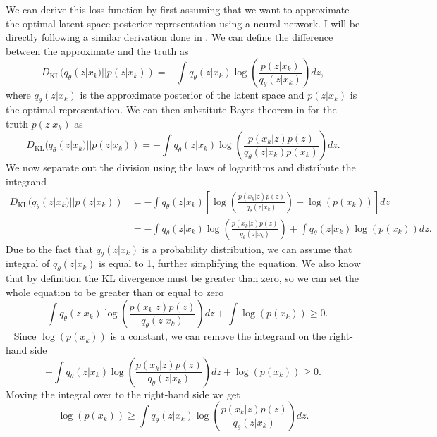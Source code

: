 We can derive this loss function by first assuming that we 
want to approximate the optimal latent space posterior 
representation using a neural network. I will be directly following a 
similar derivation done in \cite{1907.08956}. We can define the 
difference between the approximate and the truth as 
%
\begin{equation}
    D_{\textrm{KL}}(q_{\theta}(z|x_k) || p(z|x_k)) = -\int q_{\theta}(z|x_k) \log\left(\frac{p(z|x_k)}{q_{\theta}(z|x_k)}\right) dz,
\end{equation}
%
where $q_{\theta}(z|x_k)$ is the approximate posterior of the 
latent space and $p(z|x_k)$ is the optimal representation. 
We can then substitute Bayes theorem in for the truth 
$p(z|x_k)$ as 
%
\begin{equation}
    D_{\textrm{KL}}(q_{\theta}(z|x_k) || p(z|x_k)) = -\int q_{\theta}(z|x_k) 
    \log\left(\frac{p(x_k|z) p(z)}{q_{\theta}(z|x_k) p(x_k)}\right) dz. 
\end{equation}
%
We now separate out the division using the laws of logarithms and 
distribute the integrand
%
\begin{align}
    D_{\textrm{KL}}(q_{\theta}(z|x_k) || p(z|x_k)) &= -\int q_{\theta}(z|x_k) 
    \left[\log\left(\frac{p(x_k|z) p(z)}{q_{\theta}(z|x_k)}\right) - \log(p(x_k))\right] dz \nonumber \\
    &= -\int q_{\theta}(z|x_k) 
    \log\left(\frac{p(x_k|z) p(z)}{q_{\theta}(z|x_k)}\right) +
    \int q_{\theta}(z|x_k) \log(p(x_k)) dz. 
\end{align}
%
Due to the fact that $q_{\theta}(z|x_k)$ is a probability distribution, 
we can assume that integral of $q_{\theta}(z|x_k)$ is equal to 1, 
further simplifying the equation. We also know that by definition the KL 
divergence must be greater than zero, so we can set the whole 
equation to be greater than or equal to zero
%
\begin{equation}
    -\int q_{\theta}(z|x_k)
    \log\left(\frac{p(x_k|z) p(z)}{q_{\theta}(z|x_k)}\right)dz +
    \int \log(p(x_k)) \geq 0. 
\end{equation}\
%
Since $\log(p(x_k))$ is a constant, we can remove the integrand 
on the right-hand side
%
\begin{equation}
    -\int q_{\theta}(z|x_k)
    \log(\frac{p(x_k|z) p(z)}{q_{\theta}(z|x_k)})dz +
    \log(p(x_k)) \geq 0.
\end{equation}
%
Moving the integral over to the right-hand side we get 
%
\begin{equation}
    \log(p(x_k)) \geq \int q_{\theta}(z|x_k)
    \log\left(\frac{p(x_k|z) p(z)}{q_{\theta}(z|x_k)}\right)dz.\label{eq:lookbackKL}
\end{equation}

